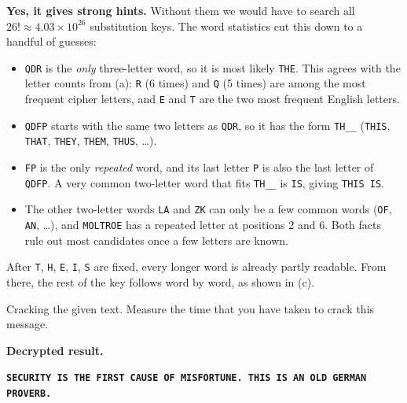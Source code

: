 \documentclass[a4paper, 10pt]{article}
\begin{document}
\begin{problem}
\begin{subproblems_alpha}
\begin{solution}
		      \textbf{Yes, it gives strong hints.}
		      Without them we would have to search all $26! \approx 4.03 \times 10^{26}$ substitution keys.
		      The word statistics cut this down to a handful of guesses:
		      \begin{itemize}
			      \item \texttt{QDR} is the \emph{only} three-letter word, so it is most likely \texttt{THE}.
			            This agrees with the letter counts from (a): \texttt{R} (6 times) and \texttt{Q} (5 times) are among the most frequent cipher letters,
			            and \texttt{E} and \texttt{T} are the two most frequent English letters.
			      \item \texttt{QDFP} starts with the same two letters as \texttt{QDR}, so it has the form \texttt{TH\_\_}
			            (\texttt{THIS}, \texttt{THAT}, \texttt{THEY}, \texttt{THEM}, \texttt{THUS}, \ldots).
			      \item \texttt{FP} is the only \emph{repeated} word, and its last letter \texttt{P} is also the last letter of \texttt{QDFP}.
			            A very common two-letter word that fits \texttt{TH\_\_} is \texttt{IS}, giving \texttt{THIS IS}.
			      \item The other two-letter words \texttt{LA} and \texttt{ZK} can only be a few common words (\texttt{OF}, \texttt{AN}, \ldots),
			            and \texttt{MOLTROE} has a repeated letter at positions 2 and 6.
			            Both facts rule out most candidates once a few letters are known.
		      \end{itemize}
		      After \texttt{T}, \texttt{H}, \texttt{E}, \texttt{I}, \texttt{S} are fixed, every longer word is already partly readable.
		      From there, the rest of the key follows word by word, as shown in (c).
	      \end{solution}
	      \myspace[v][3][mm]

	\item Cracking the given text. Measure the time that you have taken to crack this message.
	      \myspace[v][3][mm]
	      \begin{solution}
		      \textbf{Decrypted result.}
		      \begin{center}
			      \texttt{\textbf{SECURITY IS THE FIRST CAUSE OF MISFORTUNE. THIS IS AN OLD GERMAN PROVERB.}}
		      \end{center}


\end{solution}
\end{subproblems_alpha}
\end{problem}
\end{document}
